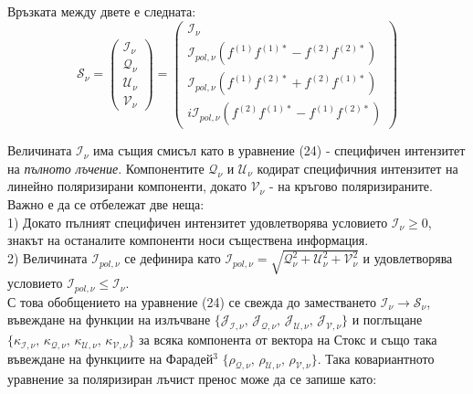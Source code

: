 Връзката между двете е следната:
\begin{equation}
	\mathcal{S}_\nu = \begin{pmatrix}
					\mathcal{I}_\nu \\
					\mathcal{Q}_\nu \\
					\mathcal{U}_\nu \\
					\mathcal{V}_\nu
				\end{pmatrix} = 
				\begin{pmatrix}
					\mathcal{I}_\nu \\
					\mathcal{I}_{pol, \nu} \left(f^{(1)} f^{(1)*} - f^{(2)} f^{(2)*} \right) \\
					\mathcal{I}_{pol, \nu} \left(f^{(1)} f^{(2)*} + f^{(2)} f^{(1)*} \right) \\
					i\mathcal{I}_{pol, \nu} \left(f^{(2)} f^{(1)*} - f^{(1)} f^{(2)*} \right)	
				\end{pmatrix} 
\end{equation}

Величината $\mathcal{I}_\nu$ има същия смисъл като в уравнение (24) - специфичен интензитет на \emph{пълното лъчение}. Компонентите $\mathcal{Q}_\nu$ и $\mathcal{U}_\nu$ кодират специфичния интензитет на линейно поляризирани компоненти, докато $\mathcal{V}_\nu$ - на кръгово поляризираните. Важно е да се отбележат две неща:\\

1) Докато пълният специфичен интензитет удовлетворява условието $\mathcal{I}_\nu \ge 0$, знакът на останалите компоненти носи съществена информация.\\

2) Величината $\mathcal{I}_{pol, \nu}$ се дефинира като $\mathcal{I}_{pol, \nu} = \sqrt{\mathcal{Q}_\nu^2 + \mathcal{U}_\nu^2 + \mathcal{V}_\nu^2}$ и удовлетворява условието $\mathcal{I}_{pol,\nu}\le\mathcal{I}_\nu$.\\

С това обобщението на уравнение (24) се свежда до заместването $\mathcal{I}_\nu \rightarrow \mathcal{S}_\nu$, въвеждане на функции на излъчване $\{\mathcal{J}_\mathcal{I,\nu}, \,\mathcal{J}_\mathcal{Q,\nu},\, \mathcal{J}_\mathcal{U,\nu},\, \mathcal{J}_\mathcal{V,\nu}\}$ и поглъщане $\{\kappa_\mathcal{I,\nu}, \,\kappa_\mathcal{Q,\nu},\, \kappa_\mathcal{U,\nu},\, \kappa_\mathcal{V,\nu}\}$ за всяка компонента от вектора на Стокс и също така въвеждане на функциите на Фарадей$^3$ $\{\rho_\mathcal{Q,\nu},\, \rho_\mathcal{U,\nu},\, \rho_\mathcal{V,\nu}\}$. Така ковариантното уравнение за поляризиран лъчист пренос може да се запише като:

